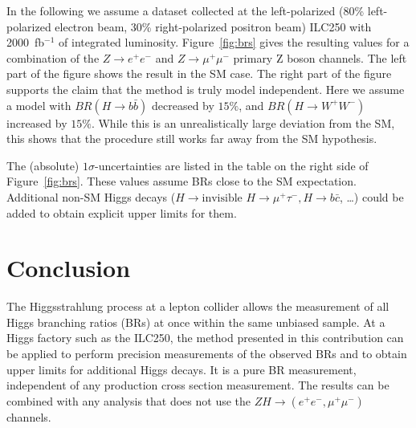 \documentclass[a4paper,11pt]{article}
\begin{document}
In the following we assume a dataset collected at the left-polarized
(80\% left-polarized electron beam, 30\% right-polarized positron beam)
ILC250 with 2000~fb$^{-1}$ of integrated luminosity.
Figure~\ref{fig:brs} gives the resulting values for a combination of the
$Z \to e^+e^-$ and $Z \to \mu^+\mu^-$ primary Z boson channels.
The left part of the figure shows the result in the SM case.
The right part of the figure supports the claim that the method
is truly model independent.
Here we assume a model with $BR(H \to b \bar{b})$ decreased by $15\%$,
and $BR(H \to W^+W^-)$ increased by $15\%$.
While this is an unrealistically large deviation from the SM, this shows that
the procedure still works far away from the SM hypothesis.


The (absolute) $1 \sigma$-uncertainties are listed in the table on the right side
of Figure~\ref{fig:brs}.
These values assume BRs close to the SM expectation.
Additional non-SM Higgs decays
($H \to \textrm{invisible}$ $H \to \mu^+\tau^-, H \to b\bar{c}$, \ldots)
could be added to obtain explicit upper limits for them.


\section{Conclusion}\label{sec:conclusion}
The Higgsstrahlung process at a lepton collider allows the measurement of
all Higgs branching ratios (BRs) at once within the same unbiased sample.
At a Higgs factory such as the ILC250, the method presented in this contribution
can be applied to perform precision measurements of the observed BRs
and to obtain upper limits for additional Higgs decays.
It is a pure BR measurement, independent of any production cross section measurement.
The results can be combined with any analysis that does not use the
$ZH \to \left( e^+ e^-, \mu^+ \mu^- \right)$ channels.



\end{document}
